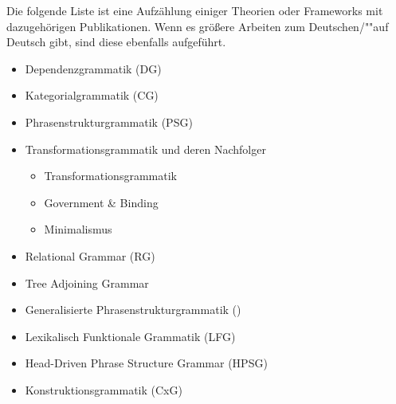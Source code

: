 Die folgende Liste ist eine Aufzählung einiger Theorien oder Frameworks mit dazugehörigen
Publikationen. Wenn es größere Arbeiten zum Deutschen/""auf Deutsch gibt, sind diese ebenfalls
aufgeführt.
\begin{itemize}
\item Dependenzgrammatik (DG)\\\citep{Kern1884a-u,Tesniere59a-u,Tesniere2015a-u,HB69a-u,HB98a,Kunze75a-u,Hudson90a-u,Weber92a,Heringer96a-u}\nocite{Tesniere80a-u}
\item Kategorialgrammatik (CG)\\
\citep*{Ajdukiewicz35a-u,Montague74b-u,Dowty79a,BFZ97a,Steedman2000a-u}
\item Phrasenstrukturgrammatik (PSG)\nocite{Bloomfield33a-u}\\
      \citep*{BHPS61a} %
\item Transformationsgrammatik und deren Nachfolger
      \begin{itemize}
      \item Transformationsgrammatik\\\citep{Chomsky57a,Bierwisch63a}
      \item Government \& Binding\indexgb\\\citep{Chomsky81a,FF87a,SS88a,Grewendorf88a,Lohnstein2014a}
      \item Minimalismus\\\citep{Chomsky95a-u,Grewendorf2002a,Adger2003a}
      \end{itemize}
\item Relational Grammar (RG)\\
      \citep{Perlmutter83a-ed,PR84a-ed}
\item Tree Adjoining Grammar\\
      \citep*{JLT75a-u,Joshi87a-u,JS97a}      
\item Generalisierte Phrasenstrukturgrammatik (\gpsg)\\
      \citep*{GKPS85a,Uszkoreit87a}
\item Lexikalisch Funktionale Grammatik (LFG)\indexlfg\\
      \citep{Bresnan82a-ed,Bresnan2001a,BF96a-ed,Berman2003a,Dalrymple2023a-ed}
\item Head-Driven Phrase Structure Grammar (HPSG)\\\citep*{ps,ps2,Kiss95b,Sag97a,Mueller99a,Mueller2002b,HPSGHandbook}
\item Konstruktionsgrammatik (CxG)\indexcxg\\\citep*{FKoC88a,KF99a,Goldberg95a,Goldberg2006a,FS2006a-ed}
\end{itemize}

